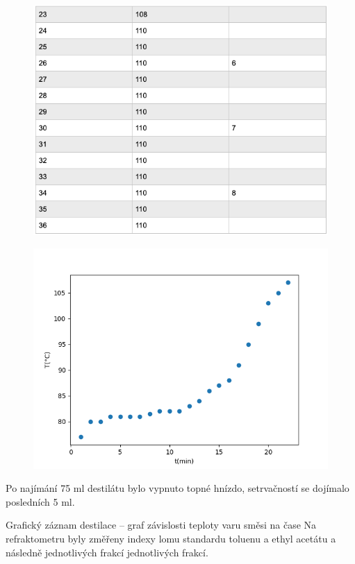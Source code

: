 \documentclass[13pt, a4paper, twoside]{article}z
\begin{document}
\begin{figure}[H]
    \centering
    \includegraphics[width=6.5in]{uloha_8_tab_2.png}
\end{figure}

\begin{figure}[H]
    \centering
    \includegraphics[width=6in]{teplota_cas.png}
\end{figure}

Po najímání 75 ml destilátu bylo vypnuto topné hnízdo, setrvačností se dojímalo posledních 5 ml.

Grafický záznam destilace – graf závislosti teploty varu směsi na čase
Na refraktometru byly změřeny indexy lomu standardu toluenu a ethyl acetátu a následně jednotlivých frakcí jednotlivých frakcí.
\end{document}

